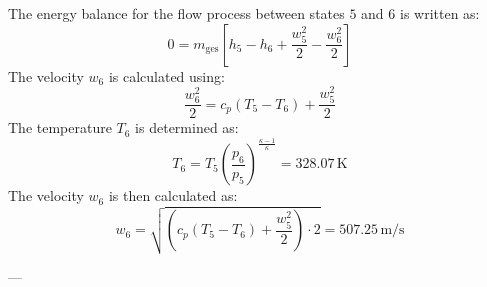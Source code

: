 The energy balance for the flow process between states \( 5 \) and \( 6 \) is written as:  
\[
0 = m_{\text{ges}} \left[ h_5 - h_6 + \frac{w_5^2}{2} - \frac{w_6^2}{2} \right]
\]  
The velocity \( w_6 \) is calculated using:  
\[
\frac{w_6^2}{2} = c_p \left( T_5 - T_6 \right) + \frac{w_5^2}{2}
\]  
The temperature \( T_6 \) is determined as:  
\[
T_6 = T_5 \left( \frac{p_6}{p_5} \right)^{\frac{\kappa - 1}{\kappa}} = 328.07 \, \text{K}
\]  
The velocity \( w_6 \) is then calculated as:  
\[
w_6 = \sqrt{ \left( c_p \left( T_5 - T_6 \right) + \frac{w_5^2}{2} \right) \cdot 2 } = 507.25 \, \text{m/s}
\]

---